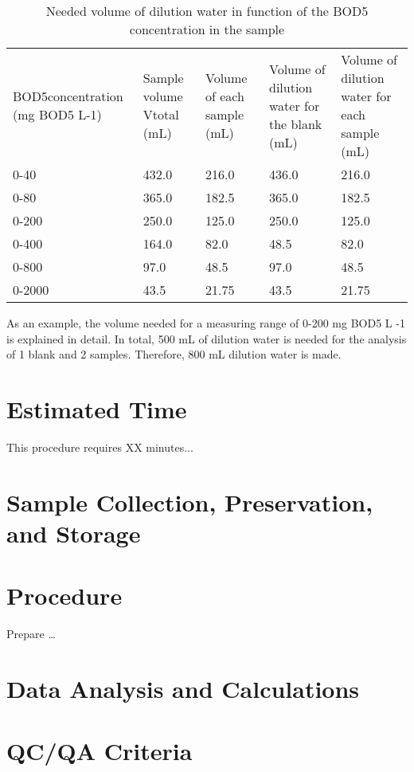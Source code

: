 \documentclass[12pt]{../SOP3_beta}\usepackage[]{graphicx}\usepackage[]{xcolor}
\begin{document}
\begin{table}
\begin{tabular}{lllll}
BOD5concentration (mg BOD5 L-1) & 
Sample volume Vtotal (mL) & Volume of each sample (mL) &
Volume of dilution water for the blank (mL) & Volume of dilution water for each sample (mL) \\
0-40 & 432.0 & 216.0 & 436.0 & 216.0\\
0-80 & 365.0 & 182.5 & 365.0 & 182.5 \\
0-200 & 250.0 & 125.0 & 250.0 & 125.0 \\
0-400 & 164.0 & 82.0 & 48.5 & 82.0 \\
0-800 & 97.0 & 48.5 & 97.0 & 48.5 \\
0-2000 & 43.5 &  21.75 & 43.5 & 21.75\\

\end{tabular}
\caption{Needed volume of dilution water in function of the BOD5 concentration in the sample}
\end{table}

As an example, the volume needed for a measuring range of 0-200 mg BOD5 L
-1
is explained in
detail. In total, 500 mL of dilution water is needed for the analysis of 1 blank and 2 samples. Therefore,
800 mL dilution water is made. 

\section{Estimated Time}

\NP This procedure requires XX minutes...

\section{Sample Collection, Preservation, and Storage}

\section{Procedure}

\NP Prepare \dots

\NP

\section{Data Analysis and Calculations}

\section{QC/QA Criteria}
\end{document}
